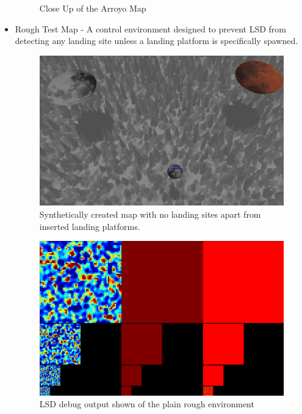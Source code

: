 \begin{itemize}
\begin{figure}[h]
        \caption{Close Up of the Arroyo Map}
    \end{figure}
    \item Rough Test Map - A control environment designed to prevent LSD from detecting any landing site unless a landing platform is specifically spawned. 
    \begin{figure}[h]
        \centering
        \includegraphics[scale=0.285]{images/evaluation/rough_test_map.png}
        \caption{Synthetically created map with no landing sites apart from inserted landing platforms.}
    \end{figure}
    \begin{figure}[h]
        \centering
        \includegraphics[scale=0.25]{images/evaluation/rough_map_LSD.png}
        \caption{LSD debug output shown of the plain rough environment}
    \end{figure}
    \begin{figure}[h]
        \centering

\end{figure}
\end{itemize}
